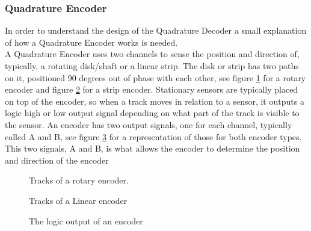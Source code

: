 \documentclass[../../../main]{subfiles}
\begin{document}
\subsubsection{Quadrature Encoder}
\label{sub:Theory}
In order to understand the design of the Quadrature Decoder a small explanation of how a Quadrature Encoder works is needed. \\
A Quadrature Encoder uses two channels to sense the position and direction of, typically, a rotating disk/shaft or a linear strip. The disk or strip has two paths on it, positioned 90 degrees out of phase with each other, see figure \ref{rotary_encoder} for a rotary encoder and figure \ref{channels} for a strip encoder. Stationary sensors are typically placed on top of the encoder, so when a track moves in relation to a sensor, it outputs a logic high or low output signal depending on what part of the track is visible to the sensor. An encoder has two output signals, one for each channel, typically called A and B, see figure \ref{output_channels} for a representation of those for both encoder types. This two signals, A and B, is what allows the encoder to determine the position and direction of the encoder

\begin{figure}[H]
  \centering
  \def\svgwidth{0.4\columnwidth}
  \fontsize{9}{9}\selectfont
  
  \caption{Tracks of a rotary encoder.}
  \label{rotary_encoder}
\end{figure}

\begin{figure}[H]
  \centering
  \def\svgwidth{0.7\columnwidth}
  \fontsize{9}{9}\selectfont
  
  \caption{Tracks of a Linear encoder}
  \label{channels}
\end{figure}

\begin{figure}[H]
  \centering
  \def\svgwidth{0.7\columnwidth}
  \fontsize{9}{9}\selectfont
  
  \caption{The logic output of an encoder}
  \label{output_channels}
\end{figure}
\end{document}
